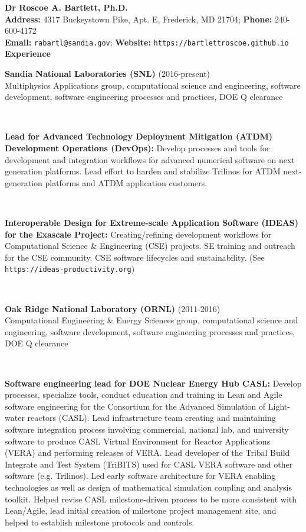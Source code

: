 \documentclass{report}
\newcommand{\itemvs}{1ex}
\newcommand{\sectitlevs}{1.2ex}
\newcommand{\indentone}{0.5in}
\newcommand{\widthone}{6.4in}
\newcommand{\pboxone}{\hspace*{\indentone}\parbox[t]{\widthone}}
\newcommand{\indenttwo}{0.75in}
\newcommand{\widthtwo}{6.15in}
\newcommand{\pboxtwo}{\hspace*{\indenttwo}\parbox[t]{\widthtwo}}
\begin{document}
%
\textbf{\LARGE Dr Roscoe A. Bartlett, Ph.D.} \\
\textbf{Address:} 4317 Buckeystown Pike, Apt. E, Frederick, MD 21704; \textbf{Phone:} 240-600-4172
\\
{}\textbf{Email:} {}\texttt{rabartl@sandia.gov};
{}\textbf{Website:} {}\texttt{https://bartlettroscoe.github.io}
%
%
\framebox[\textwidth]{}\\[2.0ex]
%
%
\textbf{\Large Experience}\\[\sectitlevs]
%
{}\pboxone{\textbf{Sandia National Laboratories (SNL)} (2016-present)\\
Multiphysics Applications group, computational science and engineering, software development, software engineering processes and practices, DOE Q clearance} \\[\itemvs]
%
{}\pboxtwo{\textbf{Lead for Advanced Technology Deployment Mitigation (ATDM) Development Operations (DevOps):}  Develop processes and tools for development and integration workflows for advanced numerical software on next generation platforms.  Lead effort to harden and stabilize Trilinos for ATDM next-generation platforms and ATDM application customers.} \\[\itemvs]
%
{}\pboxtwo{\textbf{Interoperable Design for Extreme-scale Application Software (IDEAS) for the Exascale Project:} Creating/refining development workflows for Computational Science \& Engineering (CSE) projects. SE training and outreach for the CSE community. CSE software lifecycles and sustainability.  (See \texttt{https://ideas-productivity.org})}
\\[\itemvs]
%
%
{}\pboxone{\textbf{Oak Ridge National Laboratory (ORNL)} (2011-2016)\\
Computational Engineering \& Energy Sciences group, computational science and engineering, software development, software engineering processes and practices, DOE Q clearance} \\[\itemvs]
%
{}\pboxtwo{\textbf{Software engineering lead for DOE Nuclear Energy Hub CASL:} Develop processes, specialize tools, conduct education and training in Lean and Agile software engineering for the Consortium for the Advanced Simulation of Light-water reactors (CASL).  Lead infrastructure team creating and maintaining software integration process involving commercial, national lab, and university software to produce CASL Virtual Environment for Reactor Applications (VERA) and performing releases of VERA.  Lead developer of the Tribal Build Integrate and Test System (TriBITS) used for CASL VERA software and other software (e.g. Trilinos).  Led early software architecture for VERA enabling technologies as well as design of mathematical simulation coupling and analysis toolkit.  Helped revise CASL milestone-driven process to be more consistent with Lean/Agile, lead initial creation of milestone project management site, and helped to establish milestone protocols and controls.} \\[\itemvs]
\end{document}
